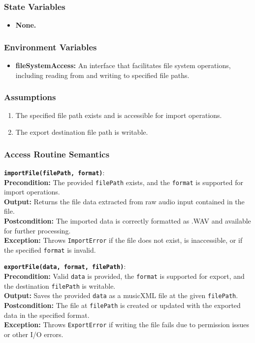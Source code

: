 \documentclass[12pt, titlepage]{article}
\begin{document}
\subsubsection{State Variables}
\begin{itemize}
    \item \textbf{None.}
\end{itemize}

\subsubsection{Environment Variables}
\begin{itemize}
    \item \textbf{fileSystemAccess:} An interface that facilitates file system operations, including reading from and writing to specified file paths.
\end{itemize}

\subsubsection{Assumptions}
\begin{enumerate}
    \item The specified file path exists and is accessible for import operations.
    \item The export destination file path is writable.
\end{enumerate}

\subsubsection{Access Routine Semantics}

\noindent \textbf{\texttt{importFile(filePath, format)}}: \\
\textbf{Precondition:} The provided \texttt{filePath} exists, and the \texttt{format} is supported for import operations. \\
\textbf{Output:} Returns the file data extracted from raw audio input contained in the file. \\
\textbf{Postcondition:} The imported data is correctly formatted as .WAV and available for further processing. \\
\textbf{Exception:} Throws \texttt{ImportError} if the file does not exist, is inaccessible, or if the specified \texttt{format} is invalid.

\vspace{2mm}
\noindent \textbf{\texttt{exportFile(data, format, filePath)}}: \\
\textbf{Precondition:} Valid \texttt{data} is provided, the \texttt{format} is supported for export, and the destination \texttt{filePath} is writable. \\
\textbf{Output:} Saves the provided \texttt{data} as a musicXML file at the given \texttt{filePath}. \\
\textbf{Postcondition:} The file at \texttt{filePath} is created or updated with the exported data in the specified format. \\
\textbf{Exception:} Throws \texttt{ExportError} if writing the file fails due to permission issues or other I/O errors.
\end{document}
